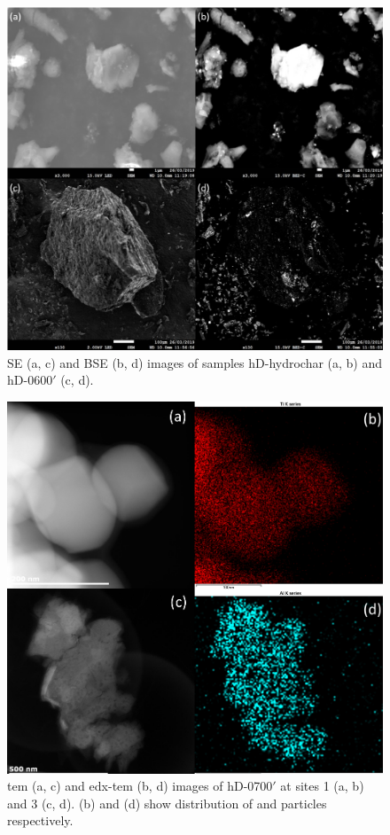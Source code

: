 \begin{figure}[ht!]
    \centering
    \includegraphics[width=\columnwidth, keepaspectratio]{4-cbs/figs/SEM_BSE.png}
    \caption{SE (a, c) and BSE (b, d) images of samples hD-hydrochar (a, b) and hD-0600$'$ (c, d).}
    \label{fig:SEM_BSE}
\end{figure}

\begin{figure}[b!]
    \centering
    \includegraphics[width=\columnwidth, keepaspectratio]{4-cbs/figs/EDX_TEM.png}
    \caption{\acrshort{tem} (a, c) and \acrshort{edx}-\acrshort{tem} (b, d) images of hD-0700$'$ at sites 1 (a, b) and 3 (c, d). (b) and (d) show distribution of  and  particles respectively.}
    \label{fig:EDX_TEM}
\end{figure}

